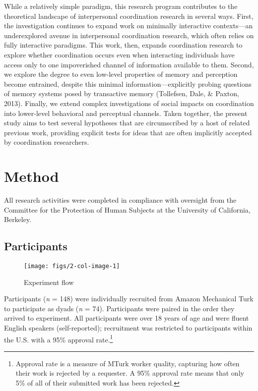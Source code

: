 \documentclass[10pt, letterpaper]{article}
\newenvironment{CodeChunk}{}{}
\begin{document}
While a relatively simple paradigm, this research program contributes to
the theoretical landscape of interpersonal coordination research in
several ways. First, the investigation continues to expand work on
minimally interactive contexts---an underexplored avenue in
interpersonal coordination research, which often relies on fully
interactive paradigms. This work, then, expands coordination research to
explore whether coordination occurs even when interacting individuals
have access only to one impoverished channel of information available to
them. Second, we explore the degree to even low-level properties of
memory and perception become entrained, despite this minimal
information---explicitly probing questions of memory systems posed by
transactive memory (Tollefsen, Dale, \& Paxton, 2013). Finally, we
extend complex investigations of social impacts on coordination into
lower-level behavioral and perceptual channels. Taken together, the
present study aims to test several hypotheses that are circumscribed by
a host of related previous work, providing explicit tests for ideas that
are often implicitly accepted by coordination researchers.

\section{Method}\label{method}

All research activities were completed in compliance with oversight from
the Committee for the Protection of Human Subjects at the University of
California, Berkeley.

\subsection{Participants}\label{participants}

\begin{CodeChunk}
\begin{figure*}[h]

{\centering \texttt{[image: figs/2-col-image-1]} 

}

\caption[Experiment flow]{Experiment flow}\label{fig:2-col-image}
\end{figure*}
\end{CodeChunk}

Participants (\emph{n} = 148) were individually recruited from Amazon
Mechanical Turk to participate as dyads (\emph{n} = 74). Participants
were paired in the order they arrived to experiment. All participants
were over 18 years of age and were fluent English speakers
(self-reported); recruitment was restricted to participants within the
U.S. with a 95\% approval
rate.\footnote{Approval rate is a measure of MTurk worker quality, capturing how often their work is rejected by a requester. A 95\% approval rate means that only 5\% of all of their submitted work has been rejected.}
\end{document}
